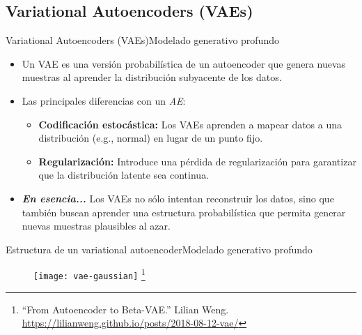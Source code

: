 \documentclass[10pt,border=3pt,tikz]{beamer}
\begin{document}
    \subsection{Variational Autoencoders (VAEs)}
    
    \begin{frame}{Variational Autoencoders (VAEs)}{Modelado generativo profundo}
        \begin{itemize}
            \item Un VAE es una versión probabilística de un autoencoder que genera nuevas muestras al aprender la distribución subyacente de los datos.
            \item Las principales diferencias con un \textit{AE}:
            \begin{itemize}
                \item \textbf{Codificación estocástica:} Los VAEs aprenden a mapear datos a una distribución (e.g., normal) en lugar de un punto fijo.
                \item \textbf{Regularización:} Introduce una pérdida de regularización para garantizar que la distribución latente sea continua.
            \end{itemize}
            \item \textbf{\textit{En esencia...}} Los VAEs no sólo intentan reconstruir los datos, sino que también buscan aprender una estructura probabilística que permita generar nuevas muestras plausibles al azar.
        \end{itemize}
    \end{frame}
    
    \begin{frame}{Estructura de un variational autoencoder}{Modelado generativo profundo}
        \begin{figure}
            \centering
            \texttt{[image: vae-gaussian]}
            \let\thefootnote\relax\footnote{{\tiny “From Autoencoder to Beta-VAE.” Lilian Weng. \url{https://lilianweng.github.io/posts/2018-08-12-vae/}}}
        \end{figure}
    \end{frame}
    
\end{document}
